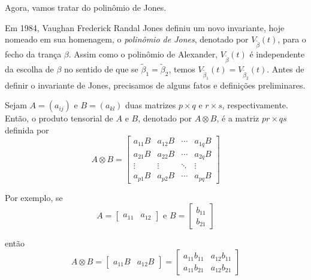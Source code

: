 	\par \vspace{0.3cm} Agora, vamos tratar do polinômio de Jones.
	\par\vspace{0.3cm} Em 1984, Vaughan Frederick Randal Jones definiu um novo invariante, hoje nomeado em sua homenagem, o \textit{polinômio de Jones}, denotado por $V_{\widetilde{\beta}}(t)$, para o fecho da trança $\beta$. Assim como o polinômio de Alexander, $V_{\widetilde{\beta}}(t)$ é independente da escolha de $\beta$ no sentido de que se $\widetilde{\beta}_1 = \widetilde{\beta}_2$, temos $V_{\widetilde{\beta}_1}(t) = V_{\widetilde{\beta}_2}(t)$. Antes de definir o invariante de Jones, precisamos de alguns fatos e definições preliminares.
	\begin{deff}
		\label{def prod tensorial}
		Sejam $A = (a_{ij})$ e $B = (a_{kl})$ duas matrizes $p\times q$ e $r\times s$, respectivamente. Então, o produto tensorial de $A$ e $B$, denotado por $A\otimes B$, é a matriz $pr\times qs$ definida por
		\begin{equation*}
		A\otimes B = 
		\begin{bmatrix}
		a_{11}B & a_{12}B & \cdots & a_{1q}B \\
		a_{21}B & a_{22}B & \cdots & a_{2q}B \\
		\vdots & \vdots & \ddots & \vdots \\
		a_{p1}B & a_{p2}B & \cdots & a_{pq}B
		\end{bmatrix}
		\end{equation*}
	\end{deff}
	\par\vspace{0.3cm} Por exemplo, se
	\begin{equation*}
	A = \begin{bmatrix}
	a_{11} & a_{12}
	\end{bmatrix}\text{ e } B = \begin{bmatrix}
	b_{11}\\
	b_{21}
	\end{bmatrix} 
	\end{equation*}
	\par\vspace{0.3cm} então
	\begin{equation*}
	A\otimes B = \begin{bmatrix}
	a_{11}B & a_{12}B
	\end{bmatrix} = \begin{bmatrix}
	a_{11}b_{11} & a_{12}b_{11}\\
	a_{11}b_{21} & a_{12}b_{21}
	\end{bmatrix}
	\end{equation*}
